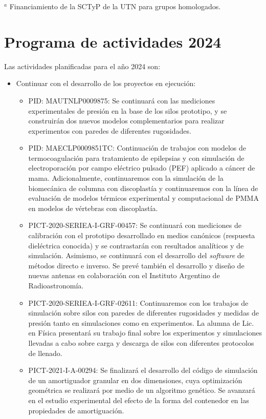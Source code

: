 \documentclass[a4paper,11pt,twoside,final,titlepage,onecolumn,openright]{report}
\begin{document}
\vspace{0.5cm}
$^a$ Financiamiento de la SCTyP de la UTN para grupos homologados. 


\chapter{Programa de actividades 2024}

Las actividades planificadas para el año 2024 son:

\begin{itemize}
\item Continuar con el desarrollo de los proyectos en ejecución:
    \begin{itemize}
\item PID: MAUTNLP0009875: Se continuará con las mediciones experimentales de presión en la base de los silos prototipo, y se construirán dos nuevos modelos complementarios para realizar experimentos con paredes de diferentes rugosidades. 
 \item PID: MAECLP0009851TC: Continuación de trabajos con modelos de termocoagulación para tratamiento de epilepsias y con simulación de electroporación por campo eléctrico pulsado (PEF) aplicado a cáncer de mama. Adicionalmente, continuaremos con la simulación de la biomecánica de columna con discoplastía y continuaremos con la línea de evaluación  de modelos térmicos experimental y computacional de PMMA en modelos de vértebras con discoplastía.
\item PICT-2020-SERIEA-I-GRF-00457: Se continuará con mediciones de calibración con el prototipo desarrollado en medios canónicos (respuesta dieléctrica conocida) y se contrastarán con resultados analíticos y de simulación. Asimismo, se continuará con el desarrollo del \textit{software} de métodos directo e inverso. Se prevé también el desarrollo y diseño de nuevas antenas en colaboración con el Instituto Argentino de Radioastronomía.
\item PICT-2020-SERIEA-I-GRF-02611: Continuaremos con los trabajos de simulación sobre silos con paredes de diferentes rugosidades y medidas de presión tanto en simulaciones como en experimentos. La alumna de Lic. en Física presentará su trabajo final sobre los experimentos y simulaciones llevadas a cabo sobre carga y descarga de silos con diferentes protocolos de llenado.
\item PICT-2021-I-A-00294: Se finalizará el desarrollo del código de simulación de un amortiguador granular en dos dimensiones, cuya optimización geométrica se realizará por medio de un algoritmo genético. Se avanzará en el estudio experimental del efecto de la forma del contenedor en las propiedades de amortiguación.

\end{itemize}
\end{itemize}
\end{document}
